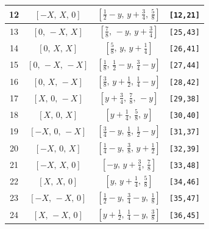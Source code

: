 \documentclass[fleqn,8pt]{jsarticle}
\begin{document}
\begin{longtable}{cccc}
12 & $\left[ - X,\, X,\, 0 \right]$ & $\left[ \frac{1}{2} - y,\, y + \frac{3}{4},\, \frac{5}{8} \right]$ & {\tt [12,21]} \\ \hline
13 & $\left[ 0,\, - X,\, X \right]$ & $\left[ \frac{7}{8},\, - y,\, y + \frac{3}{4} \right]$ & {\tt [25,43]} \\ \hline
14 & $\left[ 0,\, X,\, X \right]$ & $\left[ \frac{5}{8},\, y,\, y + \frac{1}{4} \right]$ & {\tt [26,41]} \\ \hline
15 & $\left[ 0,\, - X,\, - X \right]$ & $\left[ \frac{1}{8},\, \frac{1}{2} - y,\, \frac{3}{4} - y \right]$ & {\tt [27,44]} \\ \hline
16 & $\left[ 0,\, X,\, - X \right]$ & $\left[ \frac{3}{8},\, y + \frac{1}{2},\, \frac{1}{4} - y \right]$ & {\tt [28,42]} \\ \hline
17 & $\left[ X,\, 0,\, - X \right]$ & $\left[ y + \frac{3}{4},\, \frac{7}{8},\, - y \right]$ & {\tt [29,38]} \\ \hline
18 & $\left[ X,\, 0,\, X \right]$ & $\left[ y + \frac{1}{4},\, \frac{5}{8},\, y \right]$ & {\tt [30,40]} \\ \hline
19 & $\left[ - X,\, 0,\, - X \right]$ & $\left[ \frac{3}{4} - y,\, \frac{1}{8},\, \frac{1}{2} - y \right]$ & {\tt [31,37]} \\ \hline
20 & $\left[ - X,\, 0,\, X \right]$ & $\left[ \frac{1}{4} - y,\, \frac{3}{8},\, y + \frac{1}{2} \right]$ & {\tt [32,39]} \\ \hline
21 & $\left[ - X,\, X,\, 0 \right]$ & $\left[ - y,\, y + \frac{3}{4},\, \frac{7}{8} \right]$ & {\tt [33,48]} \\ \hline
22 & $\left[ X,\, X,\, 0 \right]$ & $\left[ y,\, y + \frac{1}{4},\, \frac{5}{8} \right]$ & {\tt [34,46]} \\ \hline
23 & $\left[ - X,\, - X,\, 0 \right]$ & $\left[ \frac{1}{2} - y,\, \frac{3}{4} - y,\, \frac{1}{8} \right]$ & {\tt [35,47]} \\ \hline
24 & $\left[ X,\, - X,\, 0 \right]$ & $\left[ y + \frac{1}{2},\, \frac{1}{4} - y,\, \frac{3}{8} \right]$ & {\tt [36,45]} \\
\end{longtable}
\renewcommand{\arraystretch}{1.2}
\end{document}
